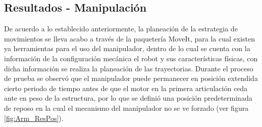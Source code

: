 \subsection{Resultados - Manipulación}
De acuerdo a lo establecido anteriormente, la planeación de la estrategia de movimientos se lleva acabo a través de la paquetería MoveIt, para la cual existen ya herramientas para el uso del manipulador, dentro de lo cual se cuenta con la información de la configuración mecánica el robot y sus características físicas, con dicha información se realiza la planeación de las trayectorias. Durante el proceso de prueba se observó que el manipulador puede permanecer en posición extendida cierto periodo de tiempo antes de que el motor en la primera articulación ceda ante en peso de la estructura, por lo que se definió una posición predeterminada de reposo en la cual el mecanismo del manipulador no se ve forzado (ver figura \ref{fig:Arm_ResPos}).

